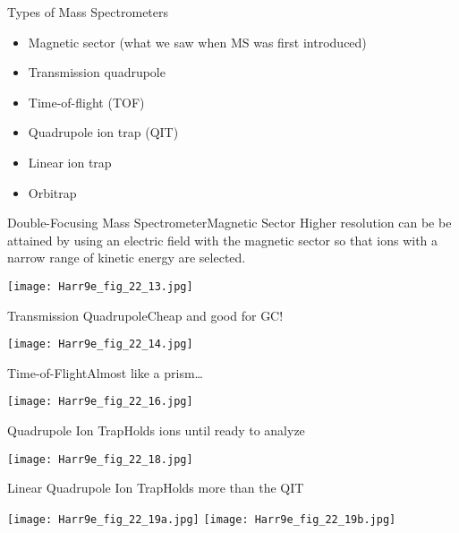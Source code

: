 \documentclass[handout]{beamer}
\begin{document}
\begin{frame}{Types of Mass Spectrometers}
	\begin{itemize}
		\item Magnetic sector (what we saw when MS was first introduced)
		\item Transmission quadrupole
		\item Time-of-flight (TOF)
		\item Quadrupole ion trap (QIT)
		\item Linear ion trap
		\item Orbitrap
	\end{itemize}
\end{frame}

\begin{frame}{Double-Focusing Mass Spectrometer}{Magnetic Sector}
	Higher resolution can be be attained by using an electric field with the
	magnetic sector so that ions with a narrow range of kinetic energy are
	selected.

	\begin{center}
		\texttt{[image: Harr9e\_fig\_22\_13.jpg]}
	\end{center}
\end{frame}

\begin{frame}{Transmission Quadrupole}{Cheap and good for GC!}
	\begin{center}
		\texttt{[image: Harr9e\_fig\_22\_14.jpg]}
	\end{center}
\end{frame}

\begin{frame}{Time-of-Flight}{Almost like a prism\ldots}
	\begin{center}
		\texttt{[image: Harr9e\_fig\_22\_16.jpg]}
	\end{center}
\end{frame}

\begin{frame}{Quadrupole Ion Trap}{Holds ions until ready to analyze}
	\begin{center}
		\texttt{[image: Harr9e\_fig\_22\_18.jpg]}
	\end{center}
\end{frame}

\begin{frame}{Linear Quadrupole Ion Trap}{Holds more than the QIT}
	\begin{center}
		\texttt{[image: Harr9e\_fig\_22\_19a.jpg]}
		\quad
		\texttt{[image: Harr9e\_fig\_22\_19b.jpg]}
	\end{center}
\end{frame}
\end{document}
